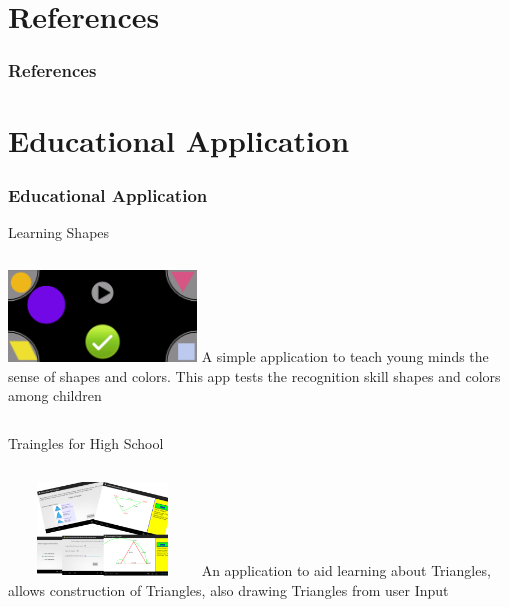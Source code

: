 \documentclass[12pt]{beamer}
\newcommand\FontviRef{\fontsize{6}{7.2}\sffamily}
\begin{document}
\section{References}
\begin{frame}[c]
\frametitle{References}

\beamertemplatetextbibitems
\FontviRef{

}
\end{frame}



\section{Educational Application}
\begin{frame}[c]
\frametitle{Educational Application}
\begin{block}{Learning Shapes}
 \begin{columns}[c]
   \includegraphics[width=5cm]{images/screen1.png}
A simple application to teach young minds the sense of shapes and colors. This app tests the recognition skill shapes and colors among children
 \end{columns}
\end{block}

\begin{block}{Traingles for High School}
 \begin{columns}[c]
   \includegraphics[width=5cm, height=2.5cm]{images/screen2.png}
An application to aid learning about Triangles, allows construction of Triangles, also drawing Triangles from user Input
\end{columns}
\end{block}
\end{frame}
\end{document}
